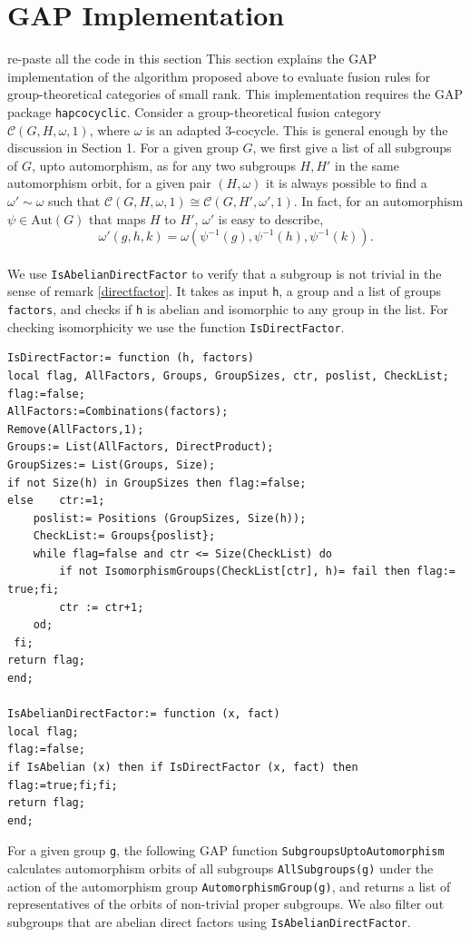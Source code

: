 \documentclass[11pt]{book}
\newcommand{\red }[1]{{\color{red}#1}}
\theoremstyle{Rem}
\theoremstyle{definition}
\numberwithin{equation}{section}
\newcommand\lstl{\lstinline}
\newcommand\inv{^{-1}}
\newcommand\C{\mathcal C}
\begin{document}
\section{GAP Implementation}
\red{re-paste all the code in this section} This section explains the GAP implementation of the algorithm proposed above to evaluate fusion rules for group-theoretical categories of small rank. This implementation requires the GAP package \lstinline{hapcocyclic}. Consider a group-theoretical fusion category $\C(G, H, \omega, 1)$, where $\omega$ is an adapted 3-cocycle. This is general enough by the discussion in Section 1.  For a given group $G$, we first give a list of all subgroups of $G$, upto automorphism, as for any two subgroups $H,H'$ in the same automorphism orbit, for a given pair $(H,\omega)$ it is always possible to find a $\omega'\sim \omega$ such that $\C(G, H, \omega, 1)\cong \C(G, H', \omega', 1)$. In fact, for  an automorphism $\psi \in \text{Aut}(G)$ that maps $H$ to $H'$, $\omega'$ is easy to describe, \begin{equation}
	\omega'(g, h, k) = \omega (\psi\inv (g), \psi\inv(h), \psi\inv(k)).
\end{equation}
\\
We use \lstinline{IsAbelianDirectFactor} to verify that a subgroup is not trivial in the sense of remark \ref{directfactor}. It takes as input  \lstinline{h}, a group and a list of groups \lstinline{factors}, and checks if \lstinline{h} is abelian and isomorphic to any group in the list. For checking isomorphicity we use the function \lstinline{IsDirectFactor}.
\begin{lstlisting}
IsDirectFactor:= function (h, factors)
local flag, AllFactors, Groups, GroupSizes, ctr, poslist, CheckList;
flag:=false;
AllFactors:=Combinations(factors);
Remove(AllFactors,1);
Groups:= List(AllFactors, DirectProduct);
GroupSizes:= List(Groups, Size);
if not Size(h) in GroupSizes then flag:=false;
else 	ctr:=1;
	poslist:= Positions (GroupSizes, Size(h));
	CheckList:= Groups{poslist};
	while flag=false and ctr <= Size(CheckList) do
		if not IsomorphismGroups(CheckList[ctr], h)= fail then flag:= true;fi;
		ctr := ctr+1;
	od;
 fi;
return flag;
end;

IsAbelianDirectFactor:= function (x, fact)
local flag;
flag:=false;
if IsAbelian (x) then if IsDirectFactor (x, fact) then flag:=true;fi;fi;
return flag;
end;

\end{lstlisting}
For a given group \lstinline{g}, the following GAP function \lstl{SubgroupsUptoAutomorphism} calculates automorphism orbits of all subgroups \lstinline{AllSubgroups(g)} under the action of the automorphism group \lstinline{AutomorphismGroup(g)}, and returns a list of representatives of the orbits of non-trivial proper subgroups. We also filter out subgroups that are abelian direct factors using \lstinline{IsAbelianDirectFactor}.
\end{document}
